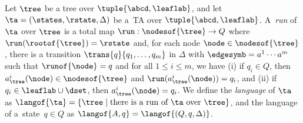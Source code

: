 
Let $\tree$ be a tree over $\tuple{\abcd,\leaflab}$, and let $\ta = (\states,
\rstate, \Delta)$ be a~TA over $\tuple{\abcd,\leaflab}$.  A~\emph{run} of~$\ta$
over $\tree$ is a total map $\run: \nodesof{\tree} \to Q$ where
$\run(\rootof{\tree}) = \rstate$ and, for each node $\node \in \nodesof{\tree}$,
there is a transition $\trans{q}{q_1, \dots, q_m}$ in $\Delta$ with
$\edgesymb = a^1 \cdots a^m$ such that $\runof{\node} = q$ and for all $1
\leq i \leq m$, we have (i) if $q_i \in Q$, then $a_{\tree}^i(\node) \in
\nodesof{\tree}$ and $\run(a_{\tree}^i(\node)) = q_i$, and (ii) if $q_i \in
\leaflab \cup \dset$, then $a_{\tree}^i(\node) = q_i$. 
%
%
%
%
We define the \emph{language} of $\ta$ as $\langof{\ta}= \{\tree
\mid \mbox{there is a run of $\ta$ over $\tree$} \}$, and the language of a~state~$q \in Q$ as $\langof{A, q} = \langof{(Q, q, \Delta)}$.


